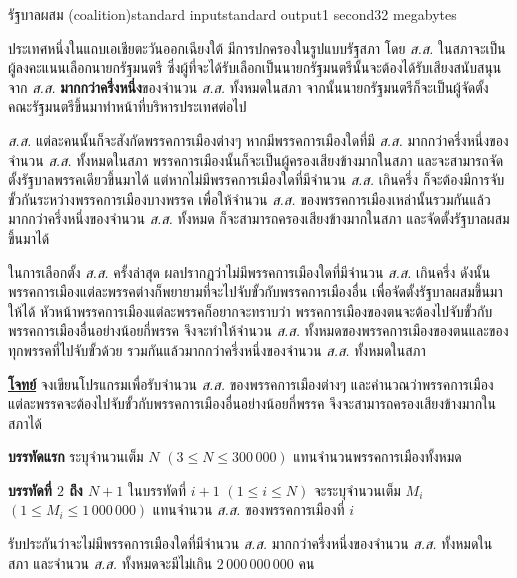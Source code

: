 \documentclass[11pt,a4paper]{article}
\begin{document}
\begin{problem}{รัฐบาลผสม (coalition)}{standard input}{standard output}{1 second}{32 megabytes}

ประเทศหนึ่งในแถบเอเชียตะวันออกเฉียงใต้ มีการปกครองในรูปแบบรัฐสภา โดย \textit{ส.ส.} ในสภาจะเป็นผู้ลงคะแนนเลือกนายกรัฐมนตรี ซึ่งผู้ที่จะได้รับเลือกเป็นนายกรัฐมนตรีนั้นจะต้องได้รับเสียงสนับสนุนจาก \textit{ส.ส.} \textbf{มากกว่าครึ่งหนึ่ง}ของจำนวน \textit{ส.ส.} ทั้งหมดในสภา จากนั้นนายกรัฐมนตรีก็จะเป็นผู้จัดตั้งคณะรัฐมนตรีขึ้นมาทำหน้าที่บริหารประเทศต่อไป

\textit{ส.ส.} แต่ละคนนั้นก็จะสังกัดพรรคการเมืองต่างๆ หากมีพรรคการเมืองใดที่มี \textit{ส.ส.} มากกว่าครึ่งหนึ่งของจำนวน \textit{ส.ส.} ทั้งหมดในสภา พรรคการเมืองนั้นก็จะเป็นผู้ครองเสียงข้างมากในสภา และจะสามารถจัดตั้งรัฐบาลพรรคเดียวขึ้นมาได้ แต่หากไม่มีพรรคการเมืองใดที่มีจำนวน \textit{ส.ส.} เกินครึ่ง ก็จะต้องมีการจับขั้วกันระหว่างพรรคการเมืองบางพรรค เพื่อให้จำนวน \textit{ส.ส.} ของพรรคการเมืองเหล่านั้นรวมกันแล้วมากกว่าครึ่งหนึ่งของจำนวน \textit{ส.ส.} ทั้งหมด ก็จะสามารถครองเสียงข้างมากในสภา และจัดตั้งรัฐบาลผสมขึ้นมาได้

ในการเลือกตั้ง \textit{ส.ส.} ครั้งล่าสุด ผลปรากฏว่าไม่มีพรรคการเมืองใดที่มีจำนวน \textit{ส.ส.} เกินครึ่ง ดังนั้น พรรคการเมืองแต่ละพรรคต่างก็พยายามที่จะไปจับขั้วกับพรรคการเมืองอื่น เพื่อจัดตั้งรัฐบาลผสมขึ้นมาให้ได้ หัวหน้าพรรคการเมืองแต่ละพรรคก็อยากจะทราบว่า พรรคการเมืองของตนจะต้องไปจับขั้วกับพรรคการเมืองอื่นอย่างน้อยกี่พรรค จึงจะทำให้จำนวน \textit{ส.ส.} ทั้งหมดของพรรคการเมืองของตนและของทุกพรรคที่ไปจับขั้วด้วย รวมกันแล้วมากกว่าครึ่งหนึ่งของจำนวน \textit{ส.ส.} ทั้งหมดในสภา

\bigskip
\underline{\textbf{โจทย์}}  จงเขียนโปรแกรมเพื่อรับจำนวน \textit{ส.ส.} ของพรรคการเมืองต่างๆ และคำนวณว่าพรรคการเมืองแต่ละพรรคจะต้องไปจับขั้วกับพรรคการเมืองอื่นอย่างน้อยกี่พรรค จึงจะสามารถครองเสียงข้างมากในสภาได้


\InputFile

\textbf{บรรทัดแรก} ระบุจำนวนเต็ม $N$ $(3 \leq N \leq 300\,000)$ แทนจำนวนพรรคการเมืองทั้งหมด

\textbf{บรรทัดที่ $2$ ถึง $N+1$} ในบรรทัดที่ $i+1$ $(1 \leq i \leq N)$ จะระบุจำนวนเต็ม $M_i$ $(1 \leq M_i \leq 1\,000\,000)$ แทนจำนวน \textit{ส.ส.} ของพรรคการเมืองที่ $i$

รับประกันว่าจะไม่มีพรรคการเมืองใดที่มีจำนวน \textit{ส.ส.} มากกว่าครึ่งหนึ่งของจำนวน \textit{ส.ส.} ทั้งหมดในสภา และจำนวน \textit{ส.ส.} ทั้งหมดจะมีไม่เกิน $2\,000\,000\,000 $ คน



\OutputFile


\end{problem}
\end{document}
